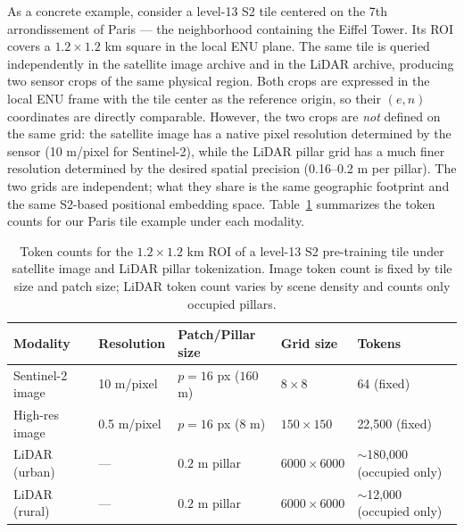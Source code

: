 \documentclass{book}
\begin{document}
As a concrete example, consider a level-13 S2 tile centered on the
7th arrondissement of Paris --- the neighborhood containing the Eiffel
Tower.  Its ROI covers a $1.2 \times 1.2$ km square in the
local ENU plane.  The same tile is queried independently in the
satellite image archive and in the LiDAR archive, producing two
sensor crops of the same physical region.  Both crops are expressed
in the local ENU frame with the tile center as the reference origin,
so their $(e, n)$ coordinates are directly comparable.  However, the
two crops are \emph{not} defined on the same grid: the satellite image
has a native pixel resolution determined by the sensor (10 m/pixel
for Sentinel-2), while the LiDAR pillar grid has a much finer
resolution determined by the desired spatial precision (0.16--0.2 m
per pillar).  The two grids are independent; what they share is the
same geographic footprint and the same S2-based positional embedding
space.  Table~\ref{tab:tile_example} summarizes the token counts for
our Paris tile example under each modality.

\begin{table}[htbp]
  \centering
  \caption{Token counts for the $1.2 \times 1.2$ km ROI of a
    level-13 S2 pre-training tile under satellite image and LiDAR
    pillar tokenization.  Image token count is fixed by tile size and
    patch size; LiDAR token count varies by scene density and counts
    only occupied pillars.}
  \label{tab:tile_example}
  \begin{tabular}{lllll}
    \hline
    \textbf{Modality} & \textbf{Resolution} & \textbf{Patch/Pillar size}
      & \textbf{Grid size} & \textbf{Tokens} \\
    \hline
    Sentinel-2 image  & 10 m/pixel  & $p=16$ px ($160$ m) & $8 \times 8$
      & 64 (fixed) \\
    High-res image    & 0.5 m/pixel & $p=16$ px ($8$ m)   & $150 \times 150$
      & 22,500 (fixed) \\
    LiDAR (urban)     & ---         & $0.2$ m pillar      & $6000 \times 6000$
      & $\sim$180,000 (occupied only) \\
    LiDAR (rural)     & ---         & $0.2$ m pillar      & $6000 \times 6000$
      & $\sim$12,000 (occupied only) \\
    \hline
  \end{tabular}
\end{table}
\end{document}
